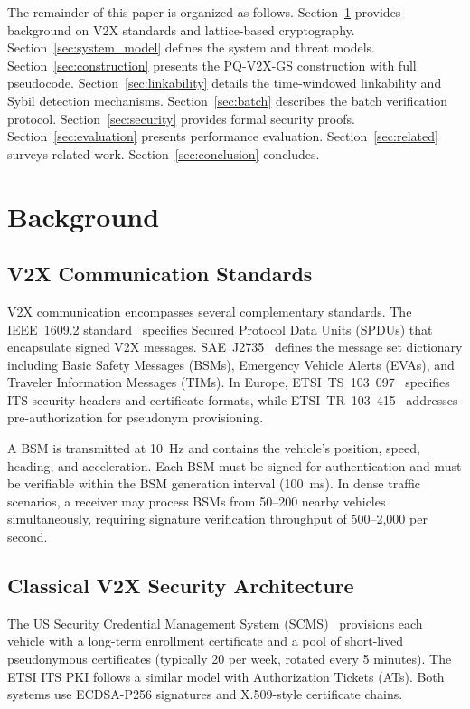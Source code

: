 \documentclass[conference,10pt]{IEEEtran}
\begin{document}
The remainder of this paper is organized as follows. Section~\ref{sec:background} provides background on V2X standards and lattice-based cryptography. Section~\ref{sec:system_model} defines the system and threat models. Section~\ref{sec:construction} presents the PQ-V2X-GS construction with full pseudocode. Section~\ref{sec:linkability} details the time-windowed linkability and Sybil detection mechanisms. Section~\ref{sec:batch} describes the batch verification protocol. Section~\ref{sec:security} provides formal security proofs. Section~\ref{sec:evaluation} presents performance evaluation. Section~\ref{sec:related} surveys related work. Section~\ref{sec:conclusion} concludes.

\section{Background}
\label{sec:background}

\subsection{V2X Communication Standards}

V2X communication encompasses several complementary standards. The IEEE~1609.2 standard~\cite{ieee16092} specifies Secured Protocol Data Units (SPDUs) that encapsulate signed V2X messages. SAE~J2735~\cite{saej2735} defines the message set dictionary including Basic Safety Messages (BSMs), Emergency Vehicle Alerts (EVAs), and Traveler Information Messages (TIMs). In Europe, ETSI~TS~103~097~\cite{etsits103097} specifies ITS security headers and certificate formats, while ETSI~TR~103~415~\cite{etsitr103415} addresses pre-authorization for pseudonym provisioning.

A BSM is transmitted at 10~Hz and contains the vehicle's position, speed, heading, and acceleration. Each BSM must be signed for authentication and must be verifiable within the BSM generation interval (100~ms). In dense traffic scenarios, a receiver may process BSMs from 50--200 nearby vehicles simultaneously, requiring signature verification throughput of 500--2{,}000 per second.

\subsection{Classical V2X Security Architecture}

The US Security Credential Management System (SCMS)~\cite{whyte2013, brecht2018} provisions each vehicle with a long-term enrollment certificate and a pool of short-lived pseudonymous certificates (typically 20 per week, rotated every 5 minutes). The ETSI ITS PKI follows a similar model with Authorization Tickets (ATs). Both systems use ECDSA-P256 signatures and X.509-style certificate chains.
\end{document}
